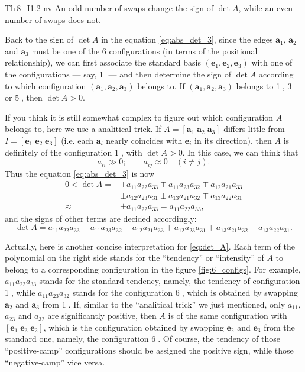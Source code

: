 \documentclass{article}
\begin{document}
\begin{Th}{Th\,8\_I1.2 nv}
    An odd number of swaps change the sign of $\det A$, while an even number of swaps does not.
\end{Th}

Back to the sign of $\det A$ in the equation \ref{eq:abs_det_3}, since the edges $\pmb{a}_1$, $\pmb{a}_2$ and $\pmb{a}_3$ must be one of the 6 configurations (in terms of the positional relationship), we can first associate the standard basis $(\pmb{e}_1, \pmb{e}_2, \pmb{e}_3)$ with one of the configurations — say, \textcircled{1} — and then determine the sign of $\det A$ according to which configuration $(\pmb{a}_1, \pmb{a}_2, \pmb{a}_3)$ belongs to. If $(\pmb{a}_1, \pmb{a}_2, \pmb{a}_3)$ belongs to \textcircled{1}, \textcircled{3} or \textcircled{5}, then $\det A>0$.

If you think it is still somewhat complex to figure out which configuration $A$ belongs to, here we use a analitical trick. If $A = [\pmb{a}_1\;\pmb{a}_2\;\pmb{a}_3]$ differs little from $I = [\pmb{e}_1\;\pmb{e}_2\;\pmb{e}_3]$ (i.e. each $\pmb{a}_i$ nearly coincides with $\pmb{e}_i$ in its direction), then $A$ is definitely of the configuration \textcircled{1}, with $\det A>0$. In this case, we can think that
$$ a_{ii} \gg 0; \qquad a_{ij}\approx 0 \quad (i\neq j). $$
Thus the equation \ref{eq:abs_det_3} is now
$$ 
\begin{aligned}
    0 < \det A = & \pm a_{11}a_{22}a_{33} \mp a_{11}a_{23}a_{32} \mp a_{12}a_{21}a_{33} \\
    & \pm a_{12}a_{23}a_{31} \pm a_{13}a_{21}a_{32} \mp a_{13}a_{22}a_{31} \\
    \approx & \pm a_{11}a_{22}a_{33} = a_{11}a_{22}a_{33},
\end{aligned}
$$
and the signs of other terms are decided accordingly:
\begin{equation}
    \det A = a_{11}a_{22}a_{33} - a_{11}a_{23}a_{32} - a_{12}a_{21}a_{33} + a_{12}a_{23}a_{31} + a_{13}a_{21}a_{32} - a_{13}a_{22}a_{31}. 
    \label{eq:det_A}
\end{equation}

Actually, here is another concise interpretation for \ref{eq:det_A}. Each term of the polynomial on the right side stands for the ``tendency'' or ``intensity'' of $A$ to belong to a corresponding configuration in the figure \ref{fig:6_configs}. For example, $a_{11}a_{22}a_{33}$ stands for the standard tendency, namely, the tendency of configuration \textcircled{1}, while $a_{11}a_{23}a_{32}$ stands for the configuration \textcircled{6}, which is obtained by swapping $\pmb{a}_2$ and $\pmb{a}_3$ from \textcircled{1}. If, similar to the ``analitical trick'' we just mentioned, only $a_{11}$, $a_{23}$ and $a_{32}$ are significantly positive, then $A$ is of the same configuration with $[\pmb{e}_1\;\pmb{e}_3\;\pmb{e}_2]$, which is the configuration obtained by swapping $\pmb{e}_2$ and $\pmb{e}_3$ from the standard one, namely, the configuration \textcircled{6}. Of course, the tendency of those ``positive-camp'' configurations should be assigned the positive sign, while those ``negative-camp'' vice versa.
\end{document}
